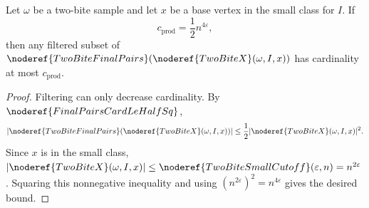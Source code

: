 \begin{helper}
Let \(\omega\) be a two-bite sample and let \(x\) be a base vertex in the
small class for \(I\). If
\[
c_{\mathrm{prod}}=\frac12 n^{4\varepsilon},
\]
then any filtered subset of
\(\noderef{TwoBiteFinalPairs}(\noderef{TwoBiteX}(\omega,I,x))\) has cardinality
at most \(c_{\mathrm{prod}}\).
\end{helper}
\begin{proof}
Filtering can only decrease cardinality. By \(\noderef{FinalPairsCardLeHalfSq}\),
\[
|\noderef{TwoBiteFinalPairs}(\noderef{TwoBiteX}(\omega,I,x))|
\le \frac12 |\noderef{TwoBiteX}(\omega,I,x)|^2.
\]
Since \(x\) is in the small class, \(|\noderef{TwoBiteX}(\omega,I,x)|\le
\noderef{TwoBiteSmallCutoff}(\varepsilon,n)=n^{2\varepsilon}\). Squaring this
nonnegative inequality and using \((n^{2\varepsilon})^2=n^{4\varepsilon}\)
gives the desired bound.
\end{proof}
